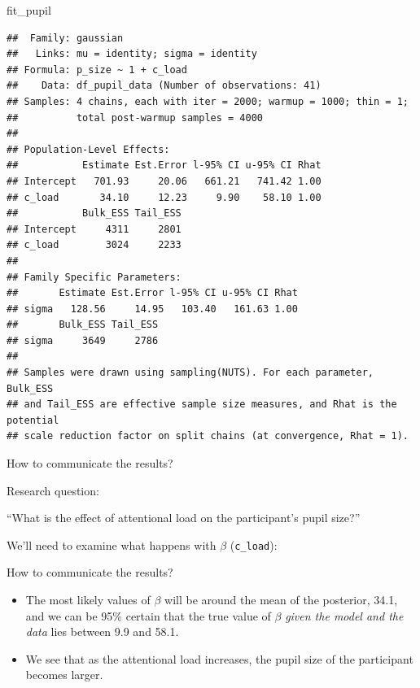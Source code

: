 \documentclass[12pt,ignorenonframetext,aspectratio=169]{beamer}
\newenvironment{Shaded}{\begin{snugshade}}{\end{snugshade}}
\newcommand{\NormalTok}[1]{#1}
\providecommand{\tightlist}{%
  \setlength{\itemsep}{0pt}\setlength{\parskip}{0pt}}
\begin{document}
\begin{frame}[fragile]

\scriptsize

\begin{Shaded}
\begin{Highlighting}[]
\NormalTok{fit_pupil}
\end{Highlighting}
\end{Shaded}

\begin{verbatim}
##  Family: gaussian 
##   Links: mu = identity; sigma = identity 
## Formula: p_size ~ 1 + c_load 
##    Data: df_pupil_data (Number of observations: 41) 
## Samples: 4 chains, each with iter = 2000; warmup = 1000; thin = 1;
##          total post-warmup samples = 4000
## 
## Population-Level Effects: 
##           Estimate Est.Error l-95% CI u-95% CI Rhat
## Intercept   701.93     20.06   661.21   741.42 1.00
## c_load       34.10     12.23     9.90    58.10 1.00
##           Bulk_ESS Tail_ESS
## Intercept     4311     2801
## c_load        3024     2233
## 
## Family Specific Parameters: 
##       Estimate Est.Error l-95% CI u-95% CI Rhat
## sigma   128.56     14.95   103.40   161.63 1.00
##       Bulk_ESS Tail_ESS
## sigma     3649     2786
## 
## Samples were drawn using sampling(NUTS). For each parameter, Bulk_ESS
## and Tail_ESS are effective sample size measures, and Rhat is the potential
## scale reduction factor on split chains (at convergence, Rhat = 1).
\end{verbatim}

\normalsize

\end{frame}

\begin{frame}[fragile]{How to communicate the results?}
\protect\hypertarget{how-to-communicate-the-results}{}

\small

\normalsize

\begin{block}{Research question:}

``What is the effect of attentional load on the participant's pupil size?''

We'll need to examine what happens with \(\beta\) (\texttt{c\_load}):

\end{block}

\end{frame}

\begin{frame}{How to communicate the results?}
\protect\hypertarget{how-to-communicate-the-results-1}{}

\begin{itemize}
\tightlist
\item
  The most likely values of \(\beta\) will be around the mean of the posterior, 34.1, and we can be 95\% certain that the true value of \(\beta\) \emph{given the model and the data} lies between 9.9 and 58.1.
\item
  We see that as the attentional load increases, the pupil size of the participant becomes larger.
\end{itemize}

\end{frame}
\end{document}
